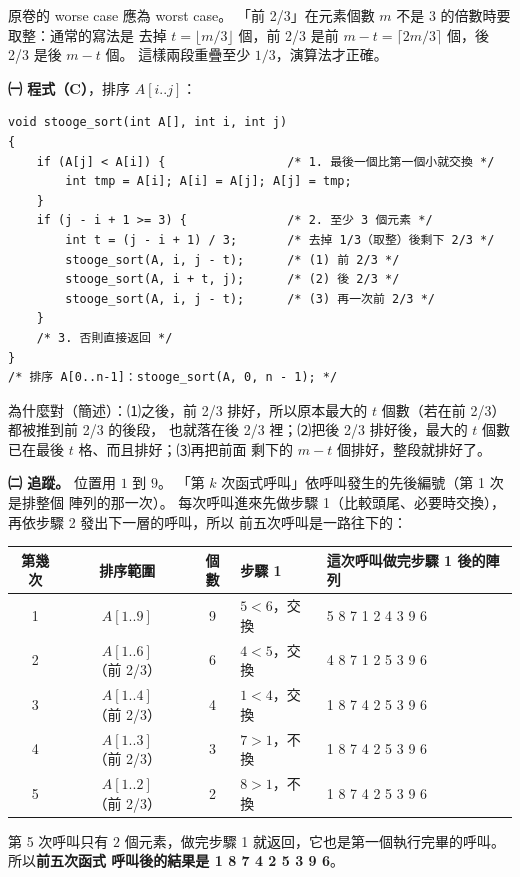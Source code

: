 \begin{pastsoln}
原卷的 worse case 應為 worst case。 「前 2/3」在元素個數 $m$ 不是 $3$ 的倍數時要取整：通常的寫法是
去掉 $t = \lfloor m/3 \rfloor$ 個，前 2/3 是前 $m - t = \lceil 2m/3 \rceil$ 個，後 2/3 是後 $m - t$ 個。
這樣兩段重疊至少 $1/3$，演算法才正確。

\textbf{㈠ 程式（C）}，排序 $A[i..j]$：
\begin{verbatim}
void stooge_sort(int A[], int i, int j)
{
    if (A[j] < A[i]) {                 /* 1. 最後一個比第一個小就交換 */
        int tmp = A[i]; A[i] = A[j]; A[j] = tmp;
    }
    if (j - i + 1 >= 3) {              /* 2. 至少 3 個元素 */
        int t = (j - i + 1) / 3;       /* 去掉 1/3（取整）後剩下 2/3 */
        stooge_sort(A, i, j - t);      /* (1) 前 2/3 */
        stooge_sort(A, i + t, j);      /* (2) 後 2/3 */
        stooge_sort(A, i, j - t);      /* (3) 再一次前 2/3 */
    }
    /* 3. 否則直接返回 */
}
/* 排序 A[0..n-1]：stooge_sort(A, 0, n - 1); */
\end{verbatim}
為什麼對（簡述）：⑴之後，前 2/3 排好，所以原本最大的 $t$ 個數（若在前 2/3）都被推到前 2/3 的後段，
也就落在後 2/3 裡；⑵把後 2/3 排好後，最大的 $t$ 個數已在最後 $t$ 格、而且排好；⑶再把前面
剩下的 $m - t$ 個排好，整段就排好了。

\textbf{㈡ 追蹤。} 位置用 $1$ 到 $9$。 「第 $k$ 次函式呼叫」依呼叫發生的先後編號（第 1 次是排整個
陣列的那一次）。 每次呼叫進來先做步驟 1（比較頭尾、必要時交換），再依步驟 2 發出下一層的呼叫，所以
前五次呼叫是一路往下的：
\begin{center}
\small
\begin{tabular}{cccll}
\toprule
第幾次 & 排序範圍 & 個數 & 步驟 1 & 這次呼叫做完步驟 1 後的陣列 \\
\midrule
1 & $A[1..9]$ & 9 & $5 < 6$，交換 & 5 8 7 1 2 4 3 9 6 \\
2 & $A[1..6]$（前 2/3） & 6 & $4 < 5$，交換 & 4 8 7 1 2 5 3 9 6 \\
3 & $A[1..4]$（前 2/3） & 4 & $1 < 4$，交換 & 1 8 7 4 2 5 3 9 6 \\
4 & $A[1..3]$（前 2/3） & 3 & $7 > 1$，不換 & 1 8 7 4 2 5 3 9 6 \\
5 & $A[1..2]$（前 2/3） & 2 & $8 > 1$，不換 & 1 8 7 4 2 5 3 9 6 \\
\bottomrule
\end{tabular}
\end{center}
第 5 次呼叫只有 $2$ 個元素，做完步驟 1 就返回，它也是第一個執行完畢的呼叫。 所以\textbf{前五次函式
呼叫後的結果是 1 8 7 4 2 5 3 9 6}。


\end{pastsoln}
